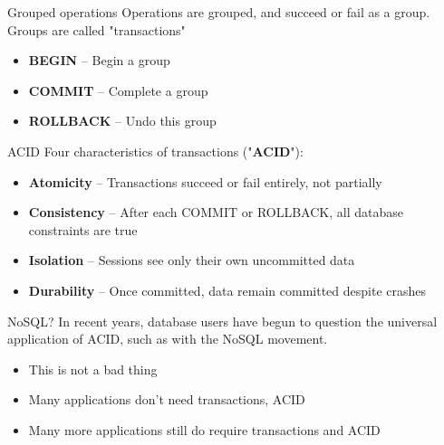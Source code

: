 \documentclass[svgnames]{beamer}
\begin{document}
\begin{frame}{Grouped operations}
    Operations are grouped, and succeed or fail as a group. Groups are called "transactions"

    \begin{itemize}
        \item \textbf{BEGIN} -- Begin a group
        \item \textbf{COMMIT} -- Complete a group
        \item \textbf{ROLLBACK} -- Undo this group
    \end{itemize}
\end{frame}

\begin{frame}{ACID}
    Four characteristics of transactions ("\textbf{ACID}"):
    \begin{itemize}
        \item \textbf{Atomicity} -- Transactions succeed or fail entirely, not partially
        \item \textbf{Consistency} -- After each COMMIT or ROLLBACK, all database constraints are true
        \item \textbf{Isolation} -- Sessions see only their own uncommitted data
        \item \textbf{Durability} -- Once committed, data remain committed despite crashes
    \end{itemize}
\end{frame}


\begin{frame}{NoSQL?}
    In recent years, database users have begun to question the universal
    application of ACID, such as with the NoSQL movement.
    \begin{itemize}
        \item This is not a bad thing
        \item Many applications don't need transactions, ACID
        \item Many more applications still do require transactions and ACID
    \end{itemize}
\end{frame}
\end{document}

